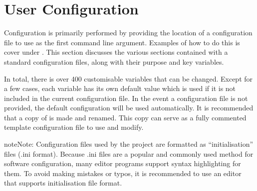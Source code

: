 \documentclass[letterpaper,10pt,english]{sphinxmanual}
\begin{document}
\sphinxstepscope


\section{User Configuration}
\label{\detokenize{usage/configuration:user-configuration}}\label{\detokenize{usage/configuration::doc}}
\sphinxAtStartPar
Configuration is primarily performed by providing the location of a configuration file to use as the
first command line argument. Examples of how to do this is cover under {\hyperref[\detokenize{usage/execution:software-usage}]{}}.
This section discusses the various sections contained with a standard configuration files, along with their
purpose and key variables.

\sphinxAtStartPar
In total, there is over 400 customisable variables that can be changed. Except for a few cases, each variable has its
own default value which is used if it is not included in the current configuration file. In the event a configuration
file is not provided, the default configuration  will be used automatically. It is recommended
that a copy of  is made and renamed. This copy can serve as a fully commented template
configuration file to use and modify.

\begin{sphinxadmonition}{note}{Note:}
\sphinxAtStartPar
Configuration files used by the project are formatted as “initialisation” files (.ini format). Because .ini
files are a popular and commonly used method for software configuration, many editor programs support syntax
highlighting for them. To avoid making mistakes or typos, it is recommended to use an editor that supports
initialisation file format.
\end{sphinxadmonition}
\end{document}

